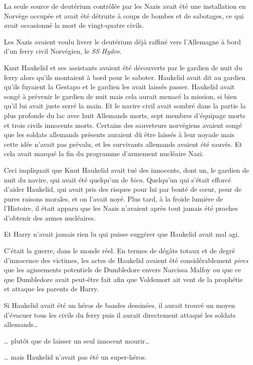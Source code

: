 La seule source de deutérium contrôlée par les Nazis avait été une installation en Norvège occupée et avait été détruite à coups de bombes et de sabotages, ce qui avait occasionné la mort de vingt-quatre civils.

Les Nazis avaient voulu livrer le deutérium déjà raffiné vers l'Allemagne à bord d'un ferry civil Norvégien, le \emph{SS Hydro}.

Knut Haukelid et ses assistants avaient été découverts par le gardien de nuit du ferry alors qu'ils montaient à bord pour le saboter. Haukelid avait dit au gardien qu'ils fuyaient la Gestapo et le gardien les avait laissés passer. Haukelid avait songé à prévenir le gardien de nuit mais cela aurait menacé la mission, si bien qu'il lui avait juste serré la main. Et le navire civil avait sombré dans la partie la plus profonde du lac avec huit Allemands morts, sept membres d'équipage morts et trois civils innocents morts. Certains des sauveteurs norvégiens avaient songé que les soldats allemands présents auraient dû être laissés à leur noyade mais cette idée n'avait pas prévalu, et les survivants allemands avaient été sauvés. Et cela avait marqué la fin du programme d'armement nucléaire Nazi.

Ceci impliquait que Knut Haukelid avait tué des innocents, dont un, le gardien de nuit du navire, qui avait été quelqu'un de \emph{bien}. Quelqu'un qui s'était efforcé d'aider Haukelid, qui avait pris des risques pour lui par bonté de cœur, pour de pures raisons morales, et on l'avait noyé. Plus tard, à la froide lumière de l'Histoire, il était apparu que les Nazis n'avaient après tout jamais été proches d'obtenir des armes nucléaires.

Et Harry n'avait jamais rien lu qui puisse suggérer que Haukelid avait mal agi.

C'était la guerre, dans le monde réel. En termes de dégâts totaux et de degré d'innocence des victimes, les actes de Haukelid avaient été considérablement \emph{pires} que les agissements potentiels de Dumbledore envers Narcissa Malfoy ou que ce que Dumbledore avait peut-être fait afin que Voldemort ait vent de la prophétie et attaque les parents de Harry.

Si Haukelid avait été un héros de bandes dessinées, il aurait trouvé un moyen d'évacuer tous les civils du ferry puis il aurait directement attaqué les soldats allemands…

… plutôt que de laisser un seul innocent mourir…

… mais Haukelid n'avait pas été un super-héros.

